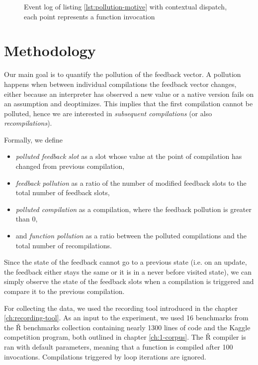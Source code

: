 \begin{figure}
	\centering
	\begin{adjustwidth}{-3cm}{-3cm}
	\end{adjustwidth}
	\caption{Event log of listing \ref{lst:pollution-motive} with contextual dispatch, each point represents a function invocation}\label{fig:pollution-motive-context}
\end{figure}

\section{Methodology}

Our main goal is to quantify the pollution of the feedback vector. A pollution happens when between individual compilations the feedback vector changes, either because an interpreter has observed a new value or a native version fails on an assumption and deoptimizes. This implies that the first compilation cannot be polluted, hence we are interested in \textit{subsequent compilations} (or also \textit{recompilations}).

Formally, we define
\begin{itemize}
	\item{} \textit{polluted feedback slot} as a slot whose value at the point of compilation has changed from previous compilation,
	\item{} \textit{feedback pollution} as a ratio of the number of modified feedback slots to the total number of feedback slots,
	\item{} \textit{polluted compilation} as a compilation, where the feedback pollution is greater than 0,
	\item{} and \textit{function pollution} as a ratio between the polluted compilations and the total number of recompilations.
\end{itemize}

Since the state of the feedback cannot go to a previous state (i.e. on an update, the feedback either stays the same or it is in a never before visited state), we can simply observe the state of the feedback slots when a compilation is triggered and compare it to the previous compilation.

For collecting the data, we used the recording tool introduced in the chapter \ref{ch:recording-tool}. As an input to the experiment, we used 16 benchmarks from the Ř benchmarks collection containing nearly 1300 lines of code and the Kaggle competition program, both outlined in chapter \ref{ch:1-corpus}. The Ř compiler is ran with default parameters, meaning that a function is compiled after 100 invocations. Compilations triggered by loop iterations are ignored.

